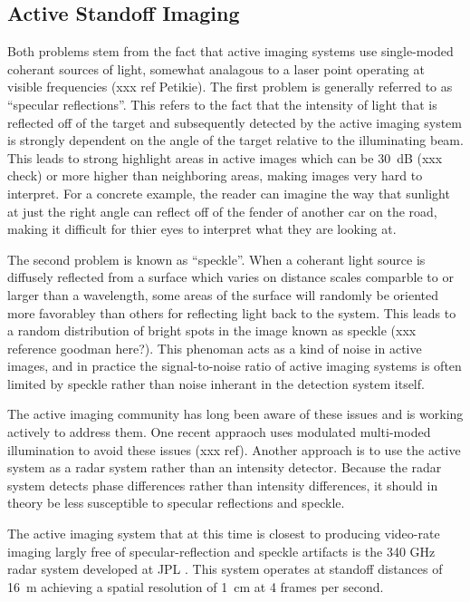 \subsection{Active Standoff Imaging}

Both problems stem from the fact that active imaging systems use single-moded coherant sources of light, somewhat analagous to a laser point operating at visible frequencies (xxx ref Petikie).
The first problem is generally referred to as ``specular reflections''.
This refers to the fact that the intensity of light that is reflected off of the target and subsequently detected by the active imaging system is strongly dependent on the angle of the target relative to the illuminating beam.
This leads to strong highlight areas in active images which can be \SI{30}{\dB} (xxx check) or more higher than neighboring areas, making images very hard to interpret.
For a concrete example, the reader can imagine the way that sunlight at just the right angle can reflect off of the fender of another car on the road, making it difficult for thier eyes to interpret what they are looking at.

The second problem is known as ``speckle''.
When a coherant light source is diffusely reflected from a surface which varies on distance scales comparble to or larger than a wavelength, some areas of the surface will randomly be oriented more favorabley than others for reflecting light back to the system.
This leads to a random distribution of bright spots in the image known as speckle (xxx reference goodman here?).
This phenoman acts as a kind of noise in active images, and in practice the signal-to-noise ratio of active imaging systems is often limited by speckle rather than noise inherant in the detection system itself.

The active imaging community has long been aware of these issues and is working actively to address them.
One recent appraoch uses modulated multi-moded illumination to avoid these issues (xxx ref).
Another approach is to use the active system as a radar system rather than an intensity detector.
Because the radar system detects phase differences rather than intensity differences, it should in theory be less susceptible to specular reflections and speckle.

The active imaging system that at this time is closest to producing video-rate imaging largly free of specular-reflection and speckle artifacts is the 340 GHz radar system developed at JPL \cite{xxx}.
This system operates at standoff distances of \SI{16}{\m} achieving a spatial resolution of \SI{1}{\cm} at 4 frames per second.

